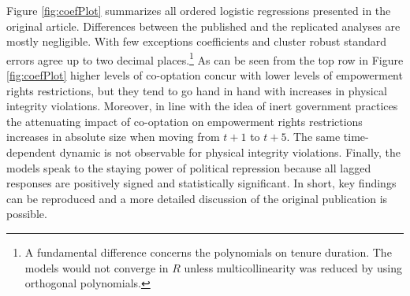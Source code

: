 Figure \ref{fig:coefPlot} summarizes all ordered logistic
regressions presented in the original article. 
Differences between the published and the replicated 
analyses are mostly negligible. With few exceptions 
coefficients and cluster robust standard errors 
agree up to two decimal places.\footnote{A fundamental
difference concerns the polynomials on tenure duration. 
The models would not converge in $R$ unless 
multicollinearity was reduced by using orthogonal 
polynomials.} As can be seen from the top row in 
Figure \ref{fig:coefPlot} higher levels of co-optation 
concur with lower levels of empowerment rights 
restrictions, but they tend to go hand in hand with 
increases in physical integrity violations. Moreover, in 
line with the idea of inert government practices the 
attenuating impact of co-optation on empowerment rights 
restrictions increases in absolute size when moving from
$t+1$ to $t+5$. The same time-dependent dynamic is not 
observable for physical integrity violations. Finally, the
models speak to the staying power of political repression 
because all lagged responses are positively signed and
statistically significant. In short, key findings can be 
reproduced and a more detailed discussion of the original 
publication is possible.


